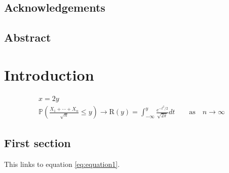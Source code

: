 \documentclass[english]{ist-thesis}
\begin{document}
\makecover

\section*{Acknowledgements}

\cleardoublepage

\section*{Abstract}

\cleardoublepage

\tableofcontents

\cleardoublepage

\chapter{Introduction}

\begin{gather}
	x = 2y \label{eq:equation1}\\
	\mathbb{P}\left(\frac{X_1 + \cdots + X_n}{\sqrt{n}} \leq y\right) \rightarrow \mathrm{R}(y) = \int_{-\infty}^{y} \frac{e^{-t^2/2}}{\sqrt{2\pi}}dt \qquad \mathrm{as} \quad n \rightarrow \infty
\end{gather}

\section{First section}

This links to equation \ref{eq:equation1}.

\lipsum
\end{document}
